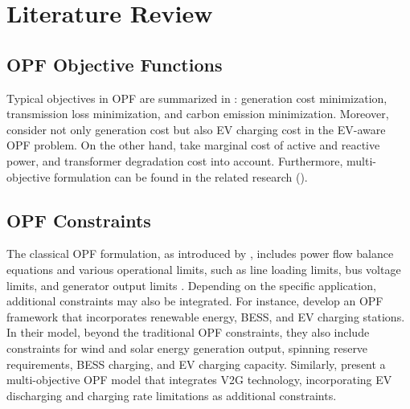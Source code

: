 \chapter{Literature Review}\label{chapter:Literature Review}


\section{\gls{OPF} Objective Functions}
Typical objectives in \gls{OPF} are summarized in \cite{yang2023optimal}: generation cost minimization, transmission loss minimization, and carbon emission minimization. Moreover, \cite{chen2012optimal} consider not only generation cost but also \gls{EV} charging cost in the \gls{EV}-aware \gls{OPF} problem. On the other hand, \cite{andrianesis2020distribution} take marginal cost of active and reactive power, and transformer degradation cost into account. Furthermore, multi-objective formulation can be found in the related research (\cite{duman2021symbiotic, paul2024multi}).


\section{\gls{OPF} Constraints}
The classical \gls{OPF} formulation, as introduced by \cite{carpentier1962contribution}, includes power flow balance equations and various operational limits, such as line loading limits, bus voltage limits, and generator output limits \cite{yang2018fundamental}. Depending on the specific application, additional constraints may also be integrated. For instance, \cite{nikkhah2020stochastic} develop an \gls{OPF} framework that incorporates renewable energy, \gls{BESS}, and \gls{EV} charging stations. In their model, beyond the traditional \gls{OPF} constraints, they also include constraints for wind and solar energy generation output, spinning reserve requirements, \gls{BESS} charging, and \gls{EV} charging capacity. Similarly, \cite{paul2024multi} present a multi-objective \gls{OPF} model that integrates \gls{V2G} technology, incorporating \gls{EV} discharging and charging rate limitations as additional constraints.


